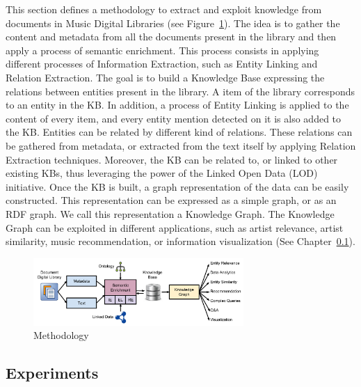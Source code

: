 This section defines a methodology to extract and exploit knowledge from documents in Music Digital Libraries (see Figure~\ref{fig:musicology:methodology-dl}). The idea is to gather the content and metadata from all the documents present in the library and then apply a process of semantic enrichment. This process consists in applying different processes of Information Extraction, such as Entity Linking and Relation Extraction. The goal is to build a Knowledge Base expressing the relations between entities present in the library. %
A item of the library corresponds to an entity in the KB. In addition, a process of Entity Linking is applied to the content of every item, and every entity mention detected on it is also added to the KB. Entities can be related by different kind of relations. These relations can be gathered from metadata, or extracted from the text itself by applying Relation Extraction techniques. Moreover, the KB can be related to, or linked to other existing KBs, thus leveraging the power of the Linked Open Data (LOD) initiative. 
Once the KB is built, a graph representation of the data can be easily constructed. This representation can be expressed as a simple graph, or as an RDF graph. We call this representation a Knowledge Graph. The Knowledge Graph can be exploited in different applications, such as artist relevance, artist similarity, music recommendation, or information visualization (See Chapter~\ref{}).

\begin{figure}[!ht]
	\centering
	\includegraphics[width=8cm]{ch05_musicology_pics/methodology-dl.jpg}
	\caption{Methodology
	\label{fig:musicology:methodology-dl}}
\end{figure}

\subsection{Experiments}

